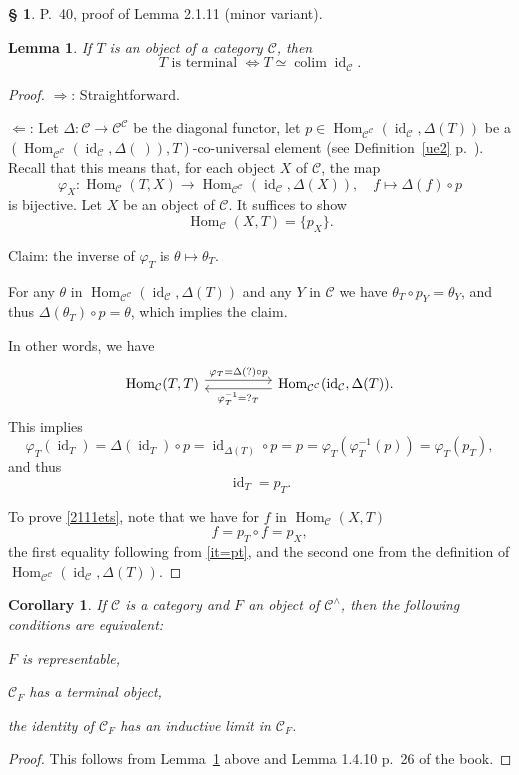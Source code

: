 \documentclass[12pt]{article}
\newtheorem{lem}[thm]{Lemma}
\newtheorem{cor}[thm]{Corollary}
\theoremstyle{remark}
\theoremstyle{definition}
\newtheorem{s}[thm]{\S}
\newcommand{\nn}{\noindent}
\newcommand{\C}{\mathcal C}
\newcommand{\pp}{\varphi}
\newcommand{\si}{\Leftarrow}
\newcommand{\ssi}{\Leftrightarrow}
\newcommand{\then}{\Rightarrow}
\DeclareMathOperator*{\colim}{colim}
\DeclareMathOperator{\id}{id}
\DeclareMathOperator{\Hom}{Hom}
\begin{document}
\begin{s} 
P.~40, proof of Lemma 2.1.11 (minor variant).

\begin{lem}\label{l2111}
If $T$ is an object of a category $\C$, then 
$$
T\text{ is terminal }\ssi T\simeq\colim\id_\C.
$$
\end{lem}

\begin{proof} $\then$: Straightforward.

\nn$\si$: Let $\Delta:\C\to\C^\C$ be the diagonal functor, let $p\in\Hom_{\C^\C}(\id_\C,\Delta(T))$ be a $(\Hom_{\C^\C}(\id_\C,\Delta(\ )),T)$\--co-universal element  (see Definition~\ref{ue2} p.~\pageref{ue2}). Recall that this means that, for each object $X$ of $\C$, the map 
$$
\pp_X:\Hom_\C(T,X)\to\Hom_{\C^\C}(\id_\C,\Delta(X)),\quad f\mapsto\Delta(f)\circ p 
$$ 
is bijective. Let $X$ be an object of $\C$. It suffices to show 
%
\begin{equation}\label{2111ets}
\Hom_\C(X,T)=\{p_X\}.
\end{equation}

Claim: the inverse of $\pp_T$ is $\theta\mapsto\theta_T$. 

For any $\theta$ in $\Hom_{\C^\C}(\id_\C,\Delta(T))$ and any $Y$ in $\C$ we have $\theta_T\circ p_Y=\theta_Y$, and thus $\Delta(\theta_T)\circ p=\theta$, which implies the claim. 

In other words, we have 
$$
\begin{tikzcd} 
\Hom_\C(T,T)\ar[yshift=0.7ex]{rr}{\pp_T=\Delta(?)\circ p}&&\Hom_{\C^\C}(\id_\C,\Delta(T)).\ar[yshift=-0.7ex]{ll}{\pp_T^{-1}=?_T}
\end{tikzcd}
$$ 
This implies 
$$
\pp_T(\id_T)=\Delta(\id_T)\circ p=\id_{\Delta(T)}\circ p=p=\pp_T(\pp_T^{-1}(p))=\pp_T(p_T),
$$ 
and thus 
%
\begin{equation}\label{it=pt}
\id_T=p_T.
\end{equation}

To prove \eqref{2111ets}, note that we have for $f$ in $\Hom_\C(X,T)$
$$
f=p_T\circ f=p_X,
$$
the first equality following from \eqref{it=pt}, and the second one from the definition of $\Hom_{\C^\C}(\id_\C,\Delta(T))$.
\end{proof}

\begin{cor}\label{c2111}
If $\C$ is a category and $F$ an object of $\C^\wedge$, then the following conditions are equivalent:

\nn{\em(a)} $F$ is representable,

\nn{\em(b)} $\C_F$ has a terminal object,

\nn{\em(c)} the identity of $\C_F$ has an inductive limit in $\C_F$.
\end{cor}

\begin{proof}
This follows from Lemma~\ref{l2111} above and Lemma 1.4.10 p.~26 of the book.
\end{proof}
\end{s}
\end{document}
